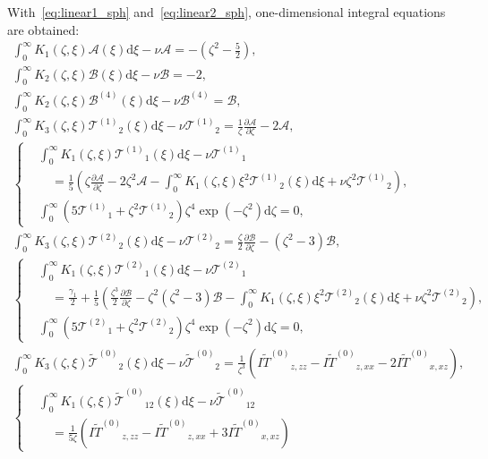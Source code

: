 \documentclass[review]{elsarticle}
\newcommand{\dd}{\mathrm{d}}
\newcommand{\pder}[2][]{\frac{\partial#1}{\partial#2}}
\newcommand{\B}{\ensuremath{\mathcal{B}^{(4)}}}
\newcommand{\T}[1]{\ensuremath{\mathcal{T}^{(#1)}}}
\newcommand{\TT}{\ensuremath{\tilde{\mathcal{T}}^{(0)}}}
\newcommand{\IFF}[1]{\ensuremath{I\tilde{#1}^{(0)}}}
\begin{document}
With~\eqref{eq:linear1_sph} and~\eqref{eq:linear2_sph}, one-dimensional integral equations are obtained:
\begin{gather}
    \int_0^\infty K_1(\zeta,\xi)\mathcal{A}(\xi)\dd\xi - \nu\mathcal{A} = -\left(\zeta^2-\frac52\right), \label{eq:A_1d}\\
    \int_0^\infty K_2(\zeta,\xi)\mathcal{B}(\xi)\dd\xi - \nu\mathcal{B} = -2, \\
    \int_0^\infty K_2(\zeta,\xi)\B(\xi)\dd\xi - \nu\B = \mathcal{B}, \\
    \int_0^\infty K_3(\zeta,\xi)\T{1}_2(\xi)\dd\xi - \nu\T{1}_2
        = \frac1\zeta\pder[\mathcal{A}]{\zeta} - 2\mathcal{A}, \\
    \left\{\begin{aligned}
    &\int_0^\infty K_1(\zeta,\xi)\T{1}_1(\xi)\dd\xi - \nu\T{1}_1 \\
        &\quad = \frac15\left( \zeta\pder[\mathcal{A}]{\zeta} - 2\zeta^2\mathcal{A}
        - \int_0^\infty K_1(\zeta,\xi)\xi^2\T{1}_2(\xi)\dd\xi
        + \nu\zeta^2\T{1}_2 \right), \\
    &\int_0^\infty \left( 5\T{1}_1 + \zeta^2\T{1}_2 \right) \zeta^4 \exp(-\zeta^2)\dd\zeta = 0,
    \end{aligned}\right.\\
    \int_0^\infty K_3(\zeta,\xi)\T{2}_2(\xi)\dd\xi - \nu\T{2}_2
        = \frac\zeta2\pder[\mathcal{B}]{\zeta} - \left(\zeta^2-3\right)\mathcal{B}, \\
    \left\{\begin{aligned}
    &\int_0^\infty K_1(\zeta,\xi)\T{2}_1(\xi)\dd\xi - \nu\T{2}_1 \\
        &\quad = \frac{\gamma_1}2 + \frac15\left( \frac{\zeta^3}2\pder[\mathcal{B}]{\zeta}
        - \zeta^2\left(\zeta^2-3\right)\mathcal{B}
        - \int_0^\infty K_1(\zeta,\xi)\xi^2\T{2}_2(\xi)\dd\xi
        + \nu\zeta^2\T{2}_2 \right), \\
    &\int_0^\infty \left( 5\T{2}_1 + \zeta^2\T{2}_2 \right) \zeta^4 \exp(-\zeta^2)\dd\zeta = 0,
    \end{aligned}\right.\\
    \int_0^\infty K_3(\zeta,\xi)\TT_2(\xi)\dd\xi - \nu\TT_2
        = \frac1{\zeta^3}\left(\IFF{T}_{z,zz} - \IFF{T}_{z,xx} - 2\IFF{T}_{x,xz}\right), \\
    \left\{\begin{aligned}
    &\int_0^\infty K_1(\zeta,\xi)\TT_{12}(\xi)\dd\xi - \nu\TT_{12} \\
        &\quad = \frac1{5\zeta}\left(\IFF{T}_{z,zz} - \IFF{T}_{z,xx} + 3\IFF{T}_{x,xz}\right)

\end{aligned}
\end{gather}
\end{document}
